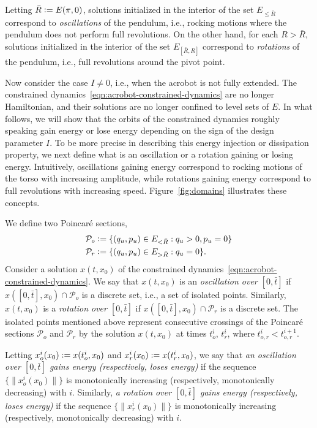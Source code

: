 \documentclass[journal,twoside,web, twocolumn]{ieeecolor}
\newcommand*{\cP}{\mathcal{P}}
\newcommand*{\eqdef}{\vcentcolon=}
\begin{document}
Letting $\bar R \eqdef E(\pi,0)$, solutions initialized in the interior of the
set $E_{\leq \bar R}$ correspond to {\em oscillations} of the pendulum, i.e.,
rocking motions where the pendulum does not perform full revolutions. On the
other hand, for each $R>\bar R$, solutions initialized in the interior of the
set $E_{[\bar R,R]}$ correspond to {\em rotations} of the pendulum, i.e., full
revolutions around the pivot point. 

Now consider the case $I\neq 0$, i.e., when the acrobot is not fully extended.
The constrained dynamics~\eqref{eqn:acrobot-constrained-dynamics} are no longer
Hamiltonian, and their solutions are no longer confined to level sets of $E$. In
what follows, we will show that the orbits of the constrained dynamics roughly
speaking gain energy or lose energy depending on the sign of the design
parameter $I$. To be more precise in describing this energy injection or
dissipation property, we next define what is an oscillation or a rotation
gaining or losing energy. Intuitively, oscillations gaining energy correspond to
rocking motions of the torso with increasing amplitude, while rotations gaining
energy correspond to full revolutions with increasing speed.
Figure~\ref{fig:domains} illustrates these concepts.

We define two Poincar\'e sections,
\[
\begin{aligned}
\cP_o & \eqdef \{(q_u,p_u) \in E_{<\bar R}: q_u >0, p_u=0\} \\
\cP_r & \eqdef \{(q_u,p_u) \in E_{> \bar R}: q_u=0\}.
\end{aligned}
\]
Consider a solution $x(t,x_0)$ of the constrained dynamics~\eqref{eqn:acrobot-constrained-dynamics}. We say that $x(t,x_0)$ is an {\em oscillation over $[0,\bar t]$} if $x([0,\bar t],x_0) \cap \cP_o$ is a discrete set, i.e., a set of isolated points. Similarly, $x(t,x_0)$ is a {\em rotation over $[0,\bar t]$} if $x([0,\bar t],x_0) \cap \cP_r$ is a discrete set. The isolated points mentioned above represent consecutive crossings of the Poincar\'e sections $\cP_o$ and $\cP_r$ by the solution $x(t,x_0)$ at times $t^i_o$, $t^i_r$, where $t^i_{o,r} < t^{i+1}_{o,r}$. 

Letting $x^i_o(x_0) \eqdef x(t^i_o,x_0)$ and $x^i_r(x_0) \eqdef x(t^i_r,x_0)$, we say that {\em an oscillation over $[0,\bar t]$ gains energy (respectively, loses energy)} if the sequence $\{\|x^i_o(x_0)\|\}$ is monotonically increasing (respectively, monotonically decreasing) with $i$. 
Similarly, {\em a rotation over $[0,\bar t]$ gains energy (respectively, loses energy)} if the sequence $\{\|x^i_r(x_0)\|\}$ is monotonically increasing (respectively, monotonically decreasing) with $i$.
\end{document}
